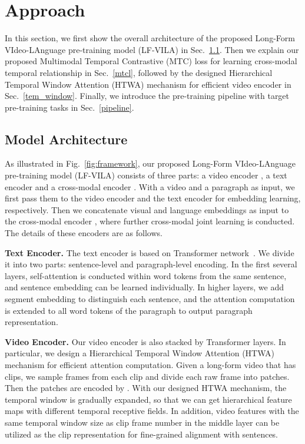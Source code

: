 \documentclass{article}
\begin{document}
\section{Approach}
\label{method}

In this section, we first show the overall architecture of the proposed Long-Form VIdeo-LAnguage pre-training model (LF-VILA) in Sec.~\ref{model_arch}. Then we explain our proposed Multimodal Temporal Contrastive (MTC) loss for learning cross-modal temporal relationship in Sec.~\ref{mtcl}, followed by the designed Hierarchical Temporal Window Attention (HTWA) mechanism for efficient video encoder in Sec.~\ref{tem_window}. Finally, we introduce the pre-training pipeline with target pre-training tasks in Sec.~\ref{pipeline}.

\subsection{Model Architecture}\label{model_arch}
As illustrated in Fig.~\ref{fig:framework}, our proposed Long-Form VIdeo-LAnguage pre-training model (LF-VILA) consists of three parts: a video encoder , a text encoder  and a cross-modal encoder . With a video and a paragraph as input, we first pass them to the video encoder  and the text encoder  for embedding learning, respectively. Then we concatenate visual and language embeddings as input to the cross-modal encoder , where further cross-modal joint learning is conducted. The details of these encoders are as follows.

\textbf{Text Encoder.}
The text encoder  is based on Transformer network~\cite{vaswani2017transformer}. We divide it into two parts: sentence-level and paragraph-level encoding. In the first several layers, self-attention is conducted within word tokens from the same sentence, and sentence embedding can be learned individually. 
In higher layers, we add segment embedding to distinguish each sentence, and the attention computation is extended to all word tokens of the paragraph to output paragraph representation. 

\textbf{Video Encoder.} 
Our video encoder is also stacked by Transformer layers. In particular, we design a Hierarchical Temporal Window Attention (HTWA) mechanism for efficient attention computation. Given a long-form video that has  clips, we sample  frames from each clip and divide each raw frame into  patches. Then the  patches are encoded by . With our designed HTWA mechanism, the temporal window is gradually expanded, so that we can get hierarchical feature maps with different temporal receptive fields. In addition, video features with the same temporal window size as clip frame number  in the middle layer can be utilized as the clip representation for fine-grained alignment with sentences.
\end{document}
